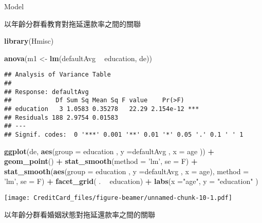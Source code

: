 \documentclass[ignorenonframetext,]{beamer}
\newenvironment{Shaded}{\begin{snugshade}}{\end{snugshade}}
\newcommand{\KeywordTok}[1]{\textcolor[rgb]{0.13,0.29,0.53}{\textbf{#1}}}
\newcommand{\DataTypeTok}[1]{\textcolor[rgb]{0.13,0.29,0.53}{#1}}
\newcommand{\StringTok}[1]{\textcolor[rgb]{0.31,0.60,0.02}{#1}}
\newcommand{\OperatorTok}[1]{\textcolor[rgb]{0.81,0.36,0.00}{\textbf{#1}}}
\newcommand{\NormalTok}[1]{#1}
\begin{document}
\begin{frame}[fragile]{Model}

以年齡分群看教育對拖延還款率之間的關聯

\begin{Shaded}
\begin{Highlighting}[]
\KeywordTok{library}\NormalTok{(Hmisc)}

\KeywordTok{anova}\NormalTok{(m1 <-}\StringTok{ }\KeywordTok{lm}\NormalTok{(defaultAvg }\OperatorTok{~}\StringTok{ }\NormalTok{education, de))}
\end{Highlighting}
\end{Shaded}

\begin{verbatim}
## Analysis of Variance Table
## 
## Response: defaultAvg
##            Df Sum Sq Mean Sq F value    Pr(>F)    
## education   3 1.0583 0.35278   22.29 2.154e-12 ***
## Residuals 188 2.9754 0.01583                      
## ---
## Signif. codes:  0 '***' 0.001 '**' 0.01 '*' 0.05 '.' 0.1 ' ' 1
\end{verbatim}

\begin{Shaded}
\begin{Highlighting}[]
\KeywordTok{ggplot}\NormalTok{(de, }\KeywordTok{aes}\NormalTok{(}\DataTypeTok{group =}\NormalTok{ education , }
           \DataTypeTok{y =}\NormalTok{defaultAvg , }\DataTypeTok{x =}\NormalTok{ age )) }\OperatorTok{+}
\StringTok{  }\KeywordTok{geom_point}\NormalTok{() }\OperatorTok{+}
\StringTok{  }\KeywordTok{stat_smooth}\NormalTok{(}\DataTypeTok{method =} \StringTok{'lm'}\NormalTok{, }\DataTypeTok{se =}\NormalTok{ F) }\OperatorTok{+}
\StringTok{  }\KeywordTok{stat_smooth}\NormalTok{(}\KeywordTok{aes}\NormalTok{(}\DataTypeTok{group =}\NormalTok{ education , }
                  \DataTypeTok{y =}\NormalTok{defaultAvg , }\DataTypeTok{x =}\NormalTok{ age), }
              \DataTypeTok{method =} \StringTok{'lm'}\NormalTok{, }\DataTypeTok{se =}\NormalTok{ F) }\OperatorTok{+}\StringTok{ }
\StringTok{  }\KeywordTok{facet_grid}\NormalTok{( . }\OperatorTok{~}\StringTok{  }\NormalTok{education) }\OperatorTok{+}
\StringTok{  }\KeywordTok{labs}\NormalTok{(}\DataTypeTok{x =}\StringTok{"age"}\NormalTok{, }\DataTypeTok{y =} \StringTok{"education"}\NormalTok{ )}
\end{Highlighting}
\end{Shaded}

\texttt{[image: CreditCard\_files/figure-beamer/unnamed-chunk-10-1.pdf]}

以年齡分群看婚姻狀態對拖延還款率之間的關聯


\end{frame}
\end{document}
